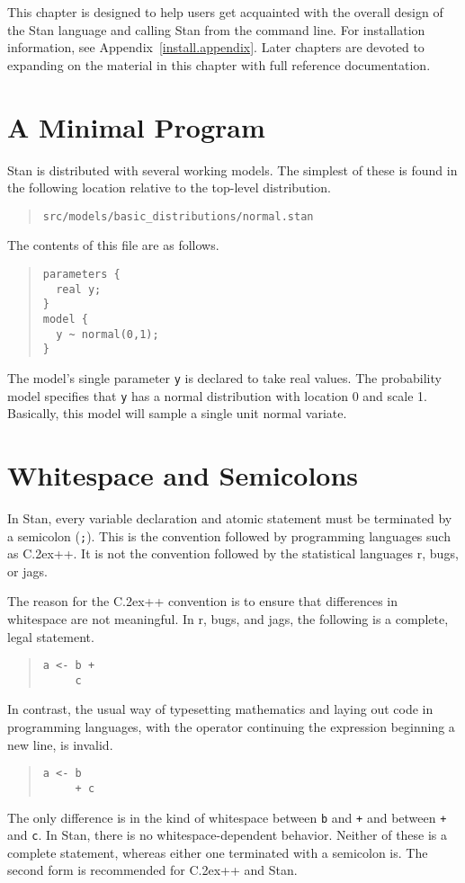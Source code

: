 \documentclass[10pt]{report}
\newcommand{\Stan}{Stan\xspace}
\newcommand*{\Cpp}{C\raise.2ex\hbox{\footnotesize ++}\xspace} %
\newcommand{\acronym}[1]{{\sc #1}\xspace}
\newcommand{\R}{\acronym{r}}
\newcommand{\BUGS}{\acronym{bugs}}
\newcommand{\JAGS}{\acronym{jags}}
\newcommand{\code}[1]{{\tt #1}}
\newcommand{\refappendix}[1]{Appendix~\ref{#1.appendix}}
\begin{document}
This chapter is designed to help users get acquainted with the overall
design of the \Stan language and calling \Stan from the command line.
For installation information, see \refappendix{install}.
Later chapters are devoted to expanding on the material in this
chapter with full reference documentation.


\section{A Minimal Program}

Stan is distributed with several working models.  The simplest of
these is found in the following location relative to the top-level
distribution.
%
\begin{quote}
\begin{Verbatim}
src/models/basic_distributions/normal.stan
\end{Verbatim}
\end{quote}
%
The contents of this file are as follows.
%
\begin{quote}
\begin{Verbatim}
parameters {
  real y;
}
model {
  y ~ normal(0,1);
}
\end{Verbatim}
\end{quote}
%
The model's single parameter \code{y} is declared to take real values.
The probability model specifies that \code{y} has a normal
distribution with location 0 and scale 1.  Basically, this model will
sample a single unit normal variate.  

\section{Whitespace and Semicolons}

In \Stan, every variable declaration and atomic statement must be
terminated by a semicolon (\code{;}).  This is the convention followed
by programming languages such as \Cpp.  It is not the convention
followed by the statistical languages \R, \BUGS, or \JAGS.

The reason for the \Cpp convention is to ensure that differences in
whitespace are not meaningful.  In \R, \BUGS, and \JAGS, the following
is a complete, legal statement.
%
\begin{quote}
\begin{Verbatim}
a <- b +
     c
\end{Verbatim}
\end{quote}
%
In contrast, the usual way of typesetting mathematics and laying out
code in programming languages, with the operator continuing the
expression beginning a new line, is invalid.
%
\begin{quote}
\begin{Verbatim}
a <- b
     + c
\end{Verbatim}
\end{quote}
%
The only difference is in the kind of whitespace between \code{b} and
\code{+} and between \code{+} and \code{c}.  In \Stan, there is no
whitespace-dependent behavior.  Neither of these is a complete
statement, whereas either one terminated with a semicolon is.  The
second form is recommended for \Cpp and \Stan.
\end{document}
